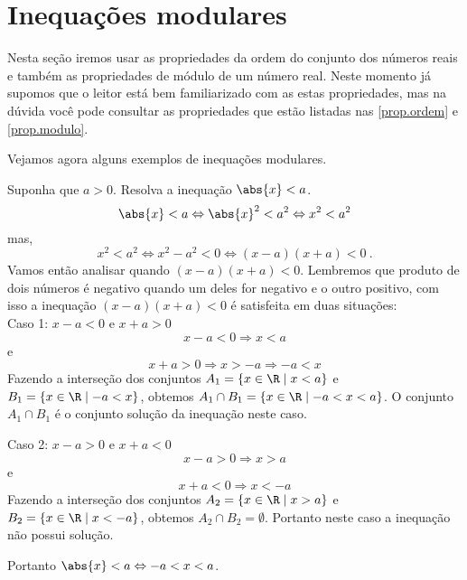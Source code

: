  \section{Inequações modulares}

 Nesta seção iremos usar as propriedades da ordem do conjunto dos números reais e também as propriedades de módulo de um número real. Neste momento já supomos que o leitor está bem familiarizado com as estas propriedades, mas na dúvida você pode consultar as propriedades que estão listadas nas \autoref{prop.ordem} e \autoref{prop.modulo}.

Vejamos agora alguns exemplos de inequações modulares.

 \begin{exem} 
  Suponha que $a> 0$. Resolva a inequação $\abs{x} < a$.
\begin{equation}
\abs{x} < a \Leftrightarrow \abs{x}^2 < a^2 \Leftrightarrow x^2 < a^2
\end{equation}
   mas,
\begin{equation}
x^2 < a^2 \Leftrightarrow x^2 - a^2 < 0 \Leftrightarrow (x-a)(x+a) < 0 \ .
\end{equation}
   Vamos então analisar quando $(x-a)(x+a) < 0$. Lembremos que produto de dois números é negativo quando um deles for negativo e o outro positivo, com isso a inequação $(x-a)(x+a) < 0$ é satisfeita em duas situações:\\
   Caso 1: $x-a<0$ e $x+a>0$
\begin{equation}
x-a<0 \Rightarrow x< a
\end{equation}
   e
\begin{equation}
x+a>0 \Rightarrow x>-a \Rightarrow -a< x
\end{equation}
  Fazendo a interseção dos conjuntos $A_1= \left\{ x \in \R \mid x<a \right\}$ e $B_1= \left\{ x \in \R \mid -a<x \right\}$, obtemos $A_1 \cap B_1= \left\{ x \in \R \mid -a< x <a \right\}$. O conjunto $A_1 \cap B_1$ é o conjunto solução da inequação neste caso.


   Caso 2: $x-a>0$ e $x+a<0$
\begin{equation}
x-a> 0 \Rightarrow x> a
\end{equation}
   e
\begin{equation}
x+a< 0 \Rightarrow x<-a
\end{equation}
   Fazendo a interseção dos conjuntos $A_2= \left\{ x \in \R \mid x> a \right\}$ e $B_2= \left\{ x \in \R \mid x<-a \right\}$, obtemos $A_2 \cap B_2= \emptyset$. Portanto neste caso a inequação não possui solução.

  Portanto $\abs{x} < a \Leftrightarrow -a< x <a$.
  \end{exem}
  
